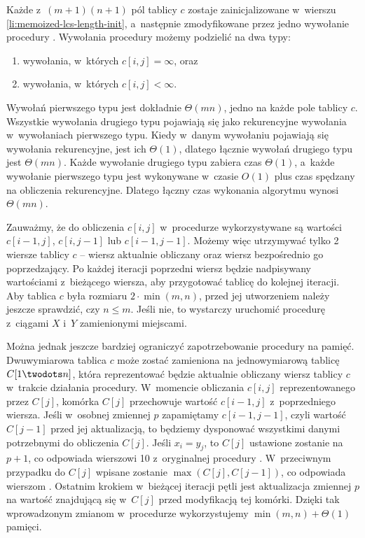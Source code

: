 Każde z~$(m+1)(n+1)$ pól tablicy $c$ zostaje zainicjalizowane w~wierszu \ref{li:memoized-lcs-length-init}, a~następnie zmodyfikowane przez jedno wywołanie procedury .
Wywołania procedury  możemy podzielić na dwa typy:
\begin{enumerate}
	\item wywołania, w~których $c[i,j]=\infty$, oraz
	\item wywołania, w~których $c[i,j]<\infty$.
\end{enumerate}
Wywołań pierwszego typu jest dokładnie $\Theta(mn)$, jedno na każde pole tablicy $c$.
Wszystkie wywołania drugiego typu pojawiają się jako rekurencyjne wywołania w~wywołaniach pierwszego typu.
Kiedy w~danym wywołaniu  pojawiają się wywołania rekurencyjne, jest ich $\Theta(1)$, dlatego łącznie wywołań drugiego typu jest $\Theta(mn)$.
Każde wywołanie drugiego typu zabiera czas $\Theta(1)$, a~każde wywołanie pierwszego typu jest wykonywane w~czasie $O(1)$ plus czas spędzany na obliczenia rekurencyjne.
Dlatego łączny czas wykonania algorytmu  wynosi $\Theta(mn)$.

\exercise %
Zauważmy, że do obliczenia $c[i,j]$ w~procedurze  wykorzystywane są wartości $c[i-1,j]$, $c[i,j-1]$ lub $c[i-1,j-1]$.
Możemy więc utrzymywać tylko 2 wiersze tablicy $c$ -- wiersz aktualnie obliczany oraz wiersz bezpośrednio go poprzedzający.
Po każdej iteracji poprzedni wiersz będzie nadpisywany wartościami z~bieżącego wiersza, aby przygotować tablicę do kolejnej iteracji.
Aby tablica $c$ była rozmiaru $2\cdot\min(m,n)$, przed jej utworzeniem należy jeszcze sprawdzić, czy $n\le m$.
Jeśli nie, to wystarczy uruchomić procedurę z~ciągami $X$ i~$Y$ zamienionymi miejscami.

Można jednak jeszcze bardziej ograniczyć zapotrzebowanie procedury na pamięć.
Dwuwymiarowa tablica $c$ może zostać zamieniona na jednowymiarową tablicę $C[1\twodots n]$, która reprezentować będzie aktualnie obliczany wiersz tablicy $c$ w~trakcie działania procedury.
W~momencie obliczania $c[i,j]$ reprezentowanego przez $C[j]$, komórka $C[j]$ przechowuje wartość $c[i-1,j]$ z~poprzedniego wiersza.
Jeśli w~osobnej zmiennej $p$ zapamiętamy $c[i-1,j-1]$, czyli wartość $C[j-1]$ przed jej aktualizacją, to będziemy dysponować wszystkimi danymi potrzebnymi do obliczenia $C[j]$.
Jeśli $x_i=y_j$, to $C[j]$ ustawione zostanie na $p+1$, co odpowiada wierszowi 10 z~oryginalnej procedury .
W~przeciwnym przypadku do $C[j]$ wpisane zostanie $\max(C[j],C[j-1])$, co odpowiada wierszom .
Ostatnim krokiem w~bieżącej iteracji pętli jest aktualizacja zmiennej $p$ na wartość znajdującą się w~$C[j]$ przed modyfikacją tej komórki.
Dzięki tak wprowadzonym zmianom w~procedurze wykorzystujemy $\min(m,n)+\Theta(1)$ pamięci.

